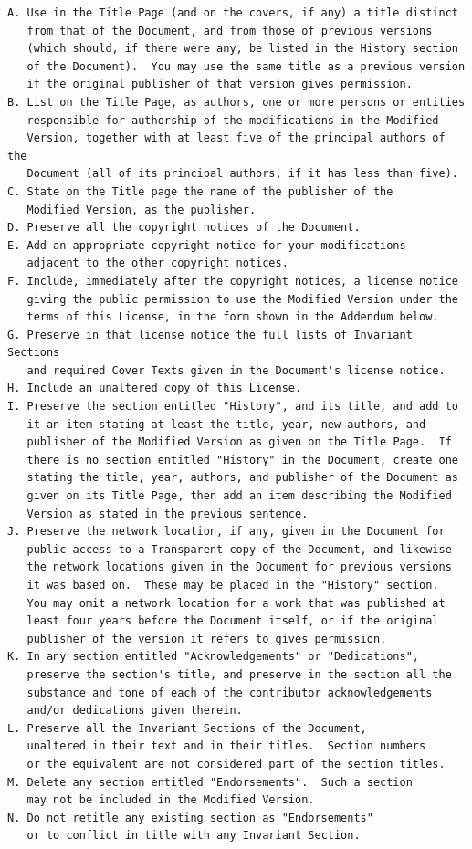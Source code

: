 \documentclass[12pt]{report}
\begin{document}
\begin{verbatim}
A. Use in the Title Page (and on the covers, if any) a title distinct
   from that of the Document, and from those of previous versions
   (which should, if there were any, be listed in the History section
   of the Document).  You may use the same title as a previous version
   if the original publisher of that version gives permission.
B. List on the Title Page, as authors, one or more persons or entities
   responsible for authorship of the modifications in the Modified
   Version, together with at least five of the principal authors of the
   Document (all of its principal authors, if it has less than five).
C. State on the Title page the name of the publisher of the
   Modified Version, as the publisher.
D. Preserve all the copyright notices of the Document.
E. Add an appropriate copyright notice for your modifications
   adjacent to the other copyright notices.
F. Include, immediately after the copyright notices, a license notice
   giving the public permission to use the Modified Version under the
   terms of this License, in the form shown in the Addendum below.
G. Preserve in that license notice the full lists of Invariant Sections
   and required Cover Texts given in the Document's license notice.
H. Include an unaltered copy of this License.
I. Preserve the section entitled "History", and its title, and add to
   it an item stating at least the title, year, new authors, and
   publisher of the Modified Version as given on the Title Page.  If
   there is no section entitled "History" in the Document, create one
   stating the title, year, authors, and publisher of the Document as
   given on its Title Page, then add an item describing the Modified
   Version as stated in the previous sentence.
J. Preserve the network location, if any, given in the Document for
   public access to a Transparent copy of the Document, and likewise
   the network locations given in the Document for previous versions
   it was based on.  These may be placed in the "History" section.
   You may omit a network location for a work that was published at
   least four years before the Document itself, or if the original
   publisher of the version it refers to gives permission.
K. In any section entitled "Acknowledgements" or "Dedications",
   preserve the section's title, and preserve in the section all the
   substance and tone of each of the contributor acknowledgements
   and/or dedications given therein.
L. Preserve all the Invariant Sections of the Document,
   unaltered in their text and in their titles.  Section numbers
   or the equivalent are not considered part of the section titles.
M. Delete any section entitled "Endorsements".  Such a section
   may not be included in the Modified Version.
N. Do not retitle any existing section as "Endorsements"
   or to conflict in title with any Invariant Section.


\end{verbatim}
\end{document}
